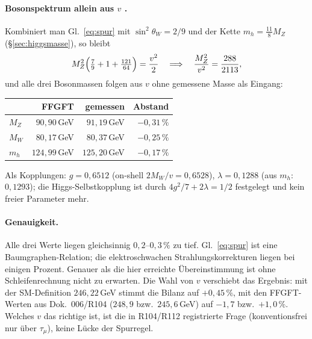 \paragraph{Bosonspektrum allein aus $v$ \KM.}
Kombiniert man Gl.~\eqref{eq:spur} mit $\sin^2\theta_W = 2/9$ und der
Kette $m_h = \tfrac{11}{8}M_Z$ (§\ref{sec:higgsmasse}), so bleibt
\[
  M_Z^2\Bigl(\tfrac79 + 1 + \tfrac{121}{64}\Bigr) = \frac{v^2}{2}
  \quad\Longrightarrow\quad
  \frac{M_Z^2}{v^2} = \frac{288}{2113},
\]
und alle drei Bosonmassen folgen aus $v$ ohne gemessene Masse als Eingang:
\begin{center}
\small\begin{tabular}{@{}lrrr@{}}
\toprule
 & FFGFT & gemessen & Abstand \\
\midrule
$M_Z$ & $90{,}90$\,GeV & $91{,}19$\,GeV & $-0{,}31\,\%$ \\
$M_W$ & $80{,}17$\,GeV & $80{,}37$\,GeV & $-0{,}25\,\%$ \\
$m_h$ & $124{,}99$\,GeV & $125{,}20$\,GeV & $-0{,}17\,\%$ \\
\bottomrule
\end{tabular}
\end{center}
Als Kopplungen: $g = 0{,}6512$ (on-shell $2M_W/v = 0{,}6528$),
$\lambda = 0{,}1288$ (aus $m_h$: $0{,}1293$); die Higgs-Selbstkopplung ist
durch $4g^2/7 + 2\lambda = 1/2$ festgelegt und kein freier Parameter mehr.

\paragraph{Genauigkeit.}
Alle drei Werte liegen gleichsinnig $0{,}2$--$0{,}3\,\%$ zu tief.
Gl.~\eqref{eq:spur} ist eine Baumgraphen-Relation; die elektroschwachen
Strahlungskorrekturen liegen bei einigen Prozent. Genauer als die hier
erreichte Übereinstimmung ist ohne Schleifenrechnung nicht zu erwarten.
Die Wahl von $v$ verschiebt das Ergebnis: mit der SM-Definition
$246{,}22$\,GeV stimmt die Bilanz auf $+0{,}45\,\%$, mit den
FFGFT-Werten aus Dok.~006/R104 ($248{,}9$ bzw.\ $245{,}6$\,GeV) auf
$-1{,}7$ bzw.\ $+1{,}0\,\%$. Welches $v$ das richtige ist, ist die in
R104/R112 registrierte Frage (konventionsfrei nur über $\tau_\mu$), keine
Lücke der Spurregel.

